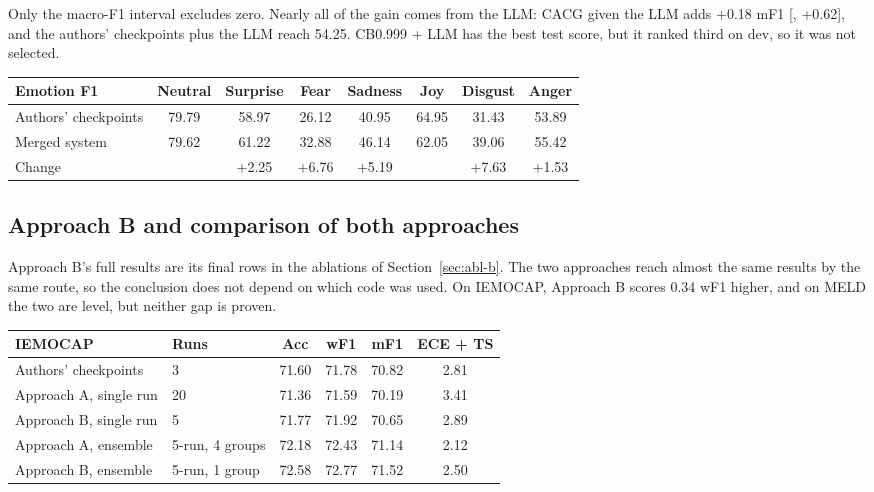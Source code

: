 \documentclass[11pt,a4paper]{article}
\newcommand{\mn}{\textminus}
\begin{document}
Only the macro-F1 interval excludes zero. Nearly all of the gain comes from the LLM: CACG given the LLM adds +0.18 mF1 [\mn0.24, +0.62], and the authors' checkpoints plus the LLM reach 54.25. CB0.999 + LLM has the best test score, but it ranked third on dev, so it was not selected.

\begin{center}
\begin{adjustbox}{max width=\linewidth}
\begin{tabular}{lccccccc}
\toprule
Emotion F1 & Neutral & Surprise & Fear & Sadness & Joy & Disgust & Anger \\
\midrule
Authors' checkpoints & 79.79 & 58.97 & 26.12 & 40.95 & 64.95 & 31.43 & 53.89 \\
Merged system & 79.62 & 61.22 & 32.88 & 46.14 & 62.05 & 39.06 & 55.42 \\
Change & \mn0.17 & +2.25 & +6.76 & +5.19 & \mn2.90 & +7.63 & +1.53 \\
\bottomrule
\end{tabular}
\end{adjustbox}
\end{center}

\subsection{Approach B and comparison of both approaches}

Approach B's full results are its final rows in the ablations of Section~\ref{sec:abl-b}. The two approaches reach almost the same results by the same route, so the conclusion does not depend on which code was used. On IEMOCAP, Approach B scores 0.34 wF1 higher, and on MELD the two are level, but neither gap is proven.

\begin{center}
\begin{adjustbox}{max width=\linewidth}
\begin{tabular}{llcccc}
\toprule
IEMOCAP & Runs & Acc & wF1 & mF1 & ECE + TS \\
\midrule
Authors' checkpoints & 3 & 71.60 & 71.78 & 70.82 & 2.81 \\
Approach A, single run & 20 & 71.36 & 71.59 & 70.19 & 3.41 \\
Approach B, single run & 5 & 71.77 & 71.92 & 70.65 & 2.89 \\
Approach A, ensemble & 5-run, 4 groups & 72.18 & 72.43 & 71.14 & 2.12 \\
Approach B, ensemble & 5-run, 1 group & 72.58 & 72.77 & 71.52 & 2.50 \\
\bottomrule
\end{tabular}
\end{adjustbox}
\end{center}
\end{document}
